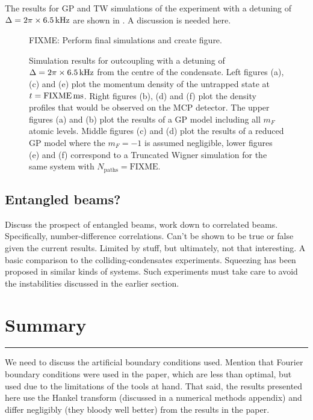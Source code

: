The results for GP and TW simulations of the experiment with a detuning of $\Delta = 2\pi \times \unit[6.5]{kHz}$ are shown in . A discussion is needed here.

\begin{figure}
    \centering
    FIXME: Perform final simulations and create figure.
    \caption{\label{Peaks:TheoryMaxFluxDetuningResults} Simulation results for outcoupling with a detuning of $\Delta = 2\pi \times \unit[6.5]{kHz}$ from the centre of the condensate. Left figures (a), (c) and (e) plot the momentum density of the untrapped state at $t=\unit[\text{FIXME}]{ms}$. Right figures (b), (d) and (f) plot the density profiles that would be observed on the MCP detector. The upper figures (a) and (b) plot the results of a GP model including all $m_F$ atomic levels. Middle figures (c) and (d) plot the results of a reduced GP model where the $m_F=-1$ is assumed negligible, lower figures (e) and (f) correspond to a Truncated Wigner simulation for the same system with $N_\text{paths} = \text{FIXME}$.}
\end{figure}


\subsection{Entangled beams?}
Discuss the prospect of entangled beams, work down to correlated beams. Specifically, number-difference correlations. Can't be shown to be true or false given the current results. Limited by stuff, but ultimately, not that interesting. A basic comparison to the colliding-condensates experiments. Squeezing has been proposed in similar kinds of systems. Such experiments must take care to avoid the instabilities discussed in the earlier section.

\section{Summary}

\hrule






We need to discuss the artificial boundary conditions used. Mention that Fourier boundary conditions were used in the paper, which are less than optimal, but used due to the limitations of the tools at hand. That said, the results presented here use the Hankel transform (discussed in a numerical methods appendix) and differ negligibly (they bloody well better) from the results in the paper.

